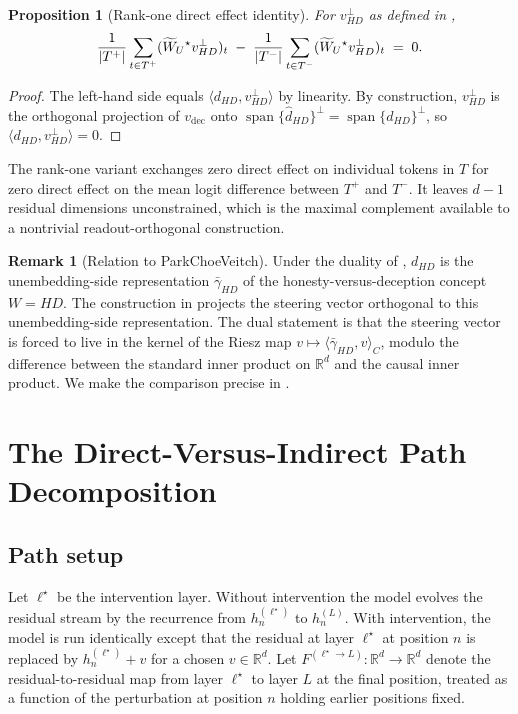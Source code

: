 \documentclass[11pt,letterpaper]{article}
\theoremstyle{plain}
\newtheorem{proposition}[theorem]{Proposition}
\theoremstyle{definition}
\newtheorem{remark}[theorem]{Remark}
\DeclareMathOperator{\spann}{span}
\newcommand{\R}{\mathbb{R}}
\newcommand{\1}{\mathbf{1}}
\newcommand{\WUt}{\widetilde{W}_{U}\mathchoice{}{}{}{}}
\newcommand{\vdec}{v_{\text{dec}}}
\newcommand{\vperp}{v^{\perp}}
\newcommand{\hres}{h}
\begin{document}
\begin{proposition}[Rank-one direct effect identity]\label{prop:rankone}
For $\vperp_{HD}$ as defined in ,
\begin{equation}
\frac{1}{|T^+|}\sum_{t \in T^+} (\WUt^\star \vperp_{HD})_t \;-\; \frac{1}{|T^-|}\sum_{t \in T^-} (\WUt^\star \vperp_{HD})_t \;=\; 0.
\label{eq:rankoneidentity}
\end{equation}
\end{proposition}

\begin{proof}
The left-hand side equals $\langle d_{HD}, \vperp_{HD}\rangle$ by linearity. By construction, $\vperp_{HD}$ is the orthogonal projection of $\vdec$ onto $\spann\{\hat{d}_{HD}\}^\perp = \spann\{d_{HD}\}^\perp$, so $\langle d_{HD}, \vperp_{HD}\rangle = 0$.
\end{proof}

The rank-one variant exchanges zero direct effect on individual tokens in $T$ for zero direct effect on the mean logit difference between $T^+$ and $T^-$. It leaves $d-1$ residual dimensions unconstrained, which is the maximal complement available to a nontrivial readout-orthogonal construction.

\begin{remark}[Relation to Park\textendash Choe\textendash Veitch]
Under the duality of \cite{park2024linear}, $d_{HD}$ is the unembedding-side representation $\bar{\gamma}_{HD}$ of the honesty-versus-deception concept $W = HD$. The construction in  projects the steering vector orthogonal to this unembedding-side representation. The dual statement is that the steering vector is forced to live in the kernel of the Riesz map $v \mapsto \langle \bar{\gamma}_{HD}, v\rangle_C$, modulo the difference between the standard inner product on $\R^d$ and the causal inner product. We make the comparison precise in .
\end{remark}

\section{The Direct-Versus-Indirect Path Decomposition}\label{sec:decomposition}

\subsection{Path setup}

Let $\ell^\star$ be the intervention layer. Without intervention the model evolves the residual stream by the recurrence  from $\hres^{(\ell^\star)}_n$ to $\hres^{(L)}_n$. With intervention, the model is run identically except that the residual at layer $\ell^\star$ at position $n$ is replaced by $\hres^{(\ell^\star)}_n + v$ for a chosen $v \in \R^d$. Let $F^{(\ell^\star \to L)} : \R^d \to \R^d$ denote the residual-to-residual map from layer $\ell^\star$ to layer $L$ at the final position, treated as a function of the perturbation at position $n$ holding earlier positions fixed.
\end{document}
